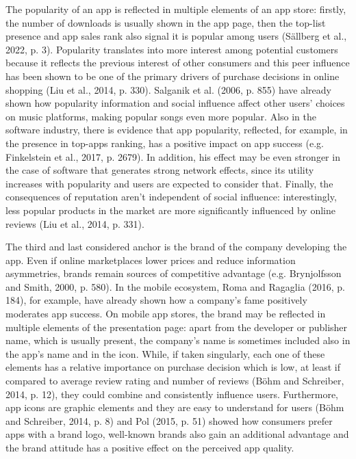 The popularity of an app is reflected in multiple elements of an app store: firstly, the number of downloads is usually shown in the app page, then the top-list presence and app sales rank also signal it is popular among users (Sällberg et al., 2022, p. 3). Popularity translates into more interest among potential customers because it reflects the previous interest of other consumers and this peer influence has been shown to be one of the primary drivers of purchase decisions in online shopping (Liu et al., 2014, p. 330). Salganik et al. (2006, p. 855) have already shown how popularity information and social influence affect other users' choices on music platforms, making popular songs even more popular. Also in the software industry, there is evidence that app popularity, reflected, for example, in the presence in top-apps ranking, has a positive impact on app success (e.g. Finkelstein et al., 2017, p. 2679). In addition, his effect may be even stronger in the case of software that generates strong network effects, since its utility increases with popularity and users are expected to consider that. Finally, the consequences of reputation aren't independent of social influence: interestingly, less popular products in the market are more significantly influenced by online reviews (Liu et al., 2014, p. 331).

The third and last considered anchor is the brand of the company developing the app. Even if online marketplaces lower prices and reduce information asymmetries, brands remain sources of competitive advantage (e.g. Brynjolfsson and Smith, 2000, p. 580). In the mobile ecosystem, Roma and Ragaglia (2016, p. 184), for example, have already shown how a company's fame positively moderates app success. On mobile app stores, the brand may be reflected in multiple elements of the presentation page: apart from the developer or publisher name, which is usually present, the company's name is sometimes included also in the app's name and in the icon. While, if taken singularly, each one of these elements has a relative importance on purchase decision which is low, at least if compared to average review rating and number of reviews (Böhm and Schreiber, 2014, p. 12), they could combine and consistently influence users. Furthermore, app icons are graphic elements and they are easy to understand for users (Böhm and Schreiber, 2014, p. 8) and Pol (2015, p. 51) showed how consumers prefer apps with a brand logo, well-known brands also gain an additional advantage and the brand attitude has a positive effect on the perceived app quality.

